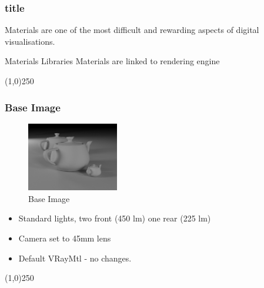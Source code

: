 \begin{frame}
\frametitle{title}
Materials are one of the most difficult and rewarding aspects of digital visualisations.

Materials Libraries
Materials are linked to rendering engine
\end{frame}
\begin{center}\line(1,0){250}\end{center}























\begin{frame}
\frametitle{Base Image}
\begin{figure}
	\centering
	\includegraphics[height=3cm]{./Materials/BaseImage}
	\caption{Base Image}
	\label{fig:baseimage}
\end{figure}
\begin{itemize}
	\item Standard lights, two front (450 lm) one rear (225 lm)
	\item Camera set to 45mm lens
	\item Default VRayMtl - no changes.
\end{itemize}
\end{frame} 
\begin{center}\line(1,0){250}\end{center}


